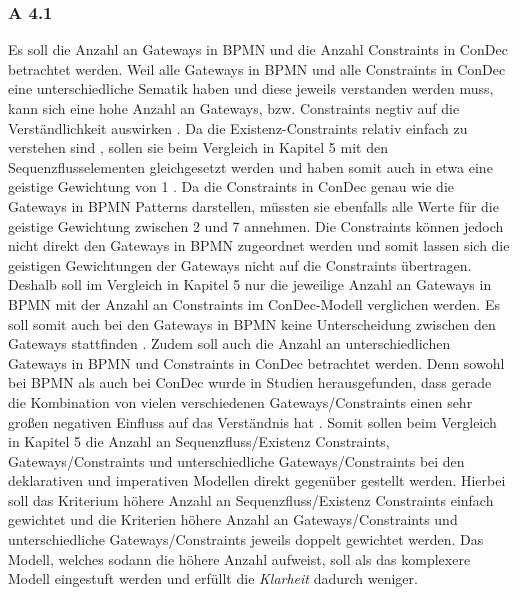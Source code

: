 \subsubsection{A 4.1}
Es soll die Anzahl an Gateways in BPMN und die Anzahl Constraints in ConDec betrachtet werden. Weil alle Gateways in BPMN und alle Constraints in ConDec eine unterschiedliche Sematik haben und diese jeweils verstanden werden muss, kann sich eine hohe Anzahl an Gateways, bzw. Constraints negtiv auf die Verständlichkeit auswirken \cite{gruhn2006adopting, thesis_maja, sabrina933}. \newline
Da die Existenz-Constraints relativ einfach zu verstehen sind \cite{thesis_maja, sabrina933}, sollen sie beim Vergleich in Kapitel 5 mit den Sequenzflusselementen gleichgesetzt werden und haben somit auch in etwa eine geistige Gewichtung von 1 \cite{thesis_maja,haisjackl2014understanding, gruhn2006adopting,sabrina933}. \newline
Da die Constraints in ConDec genau wie die Gateways in BPMN Patterns darstellen, müssten sie ebenfalls alle Werte für die geistige Gewichtung zwischen 2 und 7 annehmen. Die Constraints können jedoch nicht direkt den Gateways in BPMN zugeordnet werden und somit lassen sich die geistigen Gewichtungen der Gateways nicht auf die Constraints übertragen. Deshalb soll im Vergleich in Kapitel 5 nur die jeweilige Anzahl an Gateways in BPMN mit der Anzahl an Constraints im ConDec-Modell verglichen werden. Es soll somit auch bei den Gateways in BPMN keine Unterscheidung zwischen den Gateways stattfinden \cite{thesis_maja,haisjackl2014understanding, gruhn2006adopting}. \newline
Zudem soll auch die Anzahl an unterschiedlichen Gateways in BPMN und Constraints in ConDec betrachtet werden. Denn sowohl bei BPMN als auch bei ConDec wurde in Studien herausgefunden, dass gerade die Kombination von vielen verschiedenen Gateways/Constraints einen sehr großen negativen Einfluss auf das Verständnis hat \cite{gruhn2006adopting, thesis_maja,haisjackl2014understanding, sabrina933}. \newline
Somit sollen beim Vergleich in Kapitel 5 die Anzahl an Sequenzfluss/Existenz Constraints, Gateways/Constraints und unterschiedliche Gateways/Constraints bei den deklarativen und imperativen Modellen direkt gegenüber gestellt werden. Hierbei soll das Kriterium höhere Anzahl an Sequenzfluss/Existenz Constraints einfach gewichtet und die Kriterien höhere Anzahl an Gateways/Constraints und unterschiedliche Gateways/Constraints jeweils doppelt gewichtet werden. Das Modell, welches sodann die höhere Anzahl aufweist, soll als das komplexere Modell eingestuft werden und erfüllt die \textit{Klarheit} dadurch weniger.

